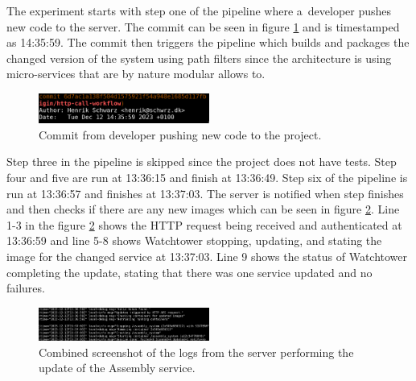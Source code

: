 \documentclass[conference]{IEEEtran}
\begin{document}
The experiment starts with step one of the pipeline where a~developer pushes new code to the server. The commit can be seen in figure \ref{fig:git-commit} and is timestamped as 14:35:59. The commit then triggers the pipeline which builds and packages the changed version of the system using path filters \cite{actions_filter} since the architecture is using micro-services that are by nature modular allows to. 
 
\begin{figure}[h]
    \centering
    \includegraphics[width=0.5\textwidth]{img/git-commit.png}
    \caption{Commit from developer pushing new code to the project.}
    \label{fig:git-commit}
\end{figure}

Step three in the pipeline is skipped since the project does not have tests. Step four and five are run at 13:36:15 and finish at 13:36:49. Step six of the pipeline is run at 13:36:57 and finishes at 13:37:03. The server is notified when step finishes and then checks if there are any new images which can be seen in figure \ref{fig:server-combined}. Line 1-3 in the figure \ref{fig:server-combined} shows the HTTP request being received and authenticated at 13:36:59 and line 5-8 shows Watchtower stopping, updating, and stating the image for the changed service at 13:37:03. Line 9 shows the status of Watchtower completing the update, stating that there was one service updated and no failures.
\begin{figure}[h]
    \centering
    \includegraphics[width=0.5\textwidth]{img/server-combined.png}
    \caption{Combined screenshot of the logs from the server performing the update of the Assembly service.}
    \label{fig:server-combined}
\end{figure}
\end{document}
